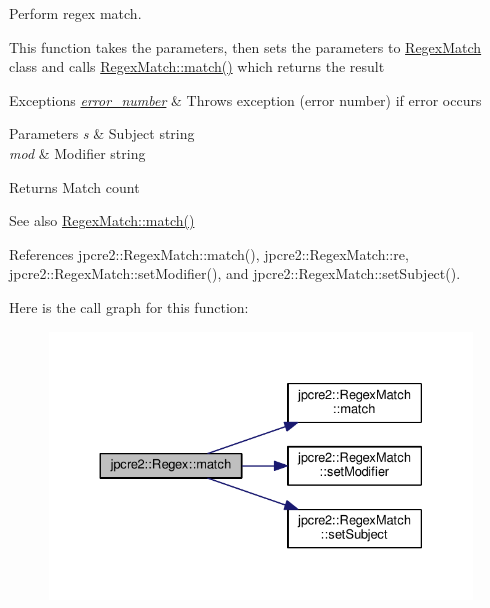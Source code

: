 Perform regex match. 

This function takes the parameters, then sets the parameters to \hyperlink{classjpcre2_1_1RegexMatch}{Regex\+Match} class and calls \hyperlink{classjpcre2_1_1RegexMatch_a5868aef3a146594ea1ebef34d122bb33}{Regex\+Match\+::match()} which returns the result 
\begin{DoxyExceptions}{Exceptions}
{\em \hyperlink{classjpcre2_1_1Regex_a91b7b795c9efe76ef4e015325ff33f1c}{error\+\_\+number}} & Throws exception (error number) if error occurs \\
\hline
\end{DoxyExceptions}

\begin{DoxyParams}{Parameters}
{\em s} & Subject string \\
\hline
{\em mod} & Modifier string \\
\hline
\end{DoxyParams}
\begin{DoxyReturn}{Returns}
Match count 
\end{DoxyReturn}
\begin{DoxySeeAlso}{See also}
\hyperlink{classjpcre2_1_1RegexMatch_a5868aef3a146594ea1ebef34d122bb33}{Regex\+Match\+::match()} 
\end{DoxySeeAlso}


References jpcre2\+::\+Regex\+Match\+::match(), jpcre2\+::\+Regex\+Match\+::re, jpcre2\+::\+Regex\+Match\+::set\+Modifier(), and jpcre2\+::\+Regex\+Match\+::set\+Subject().



Here is the call graph for this function\+:
\nopagebreak
\begin{figure}[H]
\begin{center}
\leavevmode
\includegraphics[width=330pt]{classjpcre2_1_1Regex_ab93775a93a0a537d09b9e9ab4a5a3894_cgraph}
\end{center}
\end{figure}


